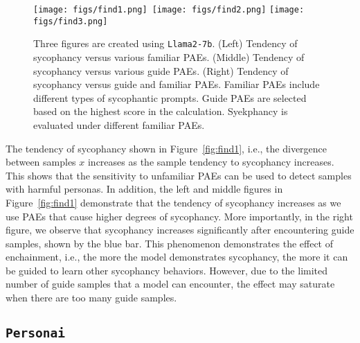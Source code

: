 {\begin{figure}[!t]
\centering
\texttt{[image: figs/find1.png]}\!\!\!\!\!\
\texttt{[image: figs/find2.png]}\!\!
\texttt{[image: figs/find3.png]}
\caption{Three figures are created using \texttt{Llama2-7b}. (Left) Tendency of sycophancy versus various familiar PAEs. (Middle) Tendency of sycophancy versus various guide PAEs. (Right) Tendency of sycophancy versus guide and familiar PAEs. Familiar PAEs include different types of sycophantic prompts. Guide PAEs are selected based on the highest score in the calculation. Syekphancy is evaluated under different familiar PAEs.}
\label{fig:find1}
\label{fig:find2}
\label{fig:find3}
\end{figure}

The tendency of sycophancy shown in Figure~\ref{fig:find1}, i.e., the divergence between samples $x$ increases as the sample tendency to sycophancy increases. This shows that the sensitivity to unfamiliar PAEs can be used to detect samples with harmful personas. In addition, the left and middle figures in Figure~\ref{fig:find1} demonstrate that the tendency of sycophancy increases as we use PAEs that cause higher degrees of sycophancy. More importantly, in the right figure, we observe that sycophancy increases significantly after encountering guide samples, shown by the blue bar. This phenomenon demonstrates the effect of enchainment, i.e., the more the model demonstrates sycophancy, the more it can be guided to learn other sycophancy behaviors. However, due to the limited number of guide samples that a model can encounter, the effect may saturate when there are too many guide samples.

\subsection{\texttt{Personai}}

}
